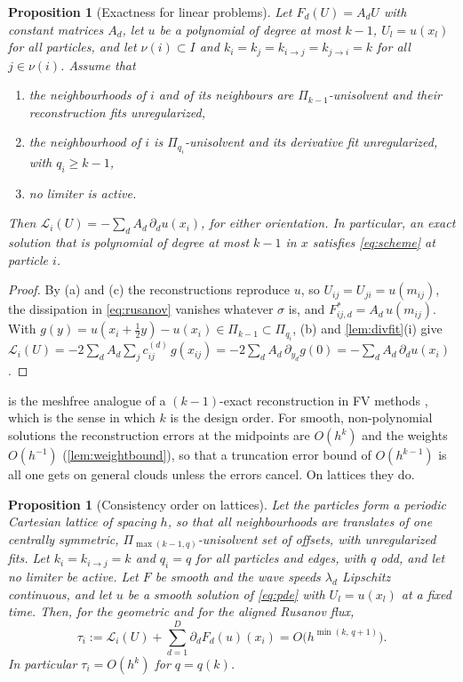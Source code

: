 \documentclass[11pt,a4paper]{article}
\theoremstyle{plain}
\newtheorem{proposition}[theorem]{Proposition}
\theoremstyle{definition}
\theoremstyle{remark}
\numberwithin{equation}{section}
\newcommand{\nb}{\nu}
\newcommand{\Lop}{\mathcal{L}}
\newcommand{\Fs}{F^{*}}
\newcommand{\ord}[2]{k_{#1\to #2}}
\newcommand{\qdiv}{q}
\begin{document}
\begin{proposition}[Exactness for linear problems]\label{prop:exact}
Let $F_d(U)=A_dU$ with constant matrices $A_d$, let $u$ be a polynomial of degree at most $k-1$, $U_l=u(x_l)$ for all particles, and let $\nb(i)\subset I$ and $k_i=k_j=\ord ij=\ord ji=k$ for all $j\in\nb(i)$. Assume that
\begin{enumerate}[label=(\alph*)]
\item the neighbourhoods of $i$ and of its neighbours are $\Pi_{k-1}$-unisolvent and their reconstruction fits unregularized,
\item the neighbourhood of $i$ is $\Pi_{q_i}$-unisolvent and its derivative fit unregularized, with $q_i\ge k-1$,
\item no limiter is active.
\end{enumerate}
Then $\Lop_i(U)=-\sum_d A_d\,\partial_du(x_i)$, for either orientation. In particular, an exact solution that is polynomial of degree at most $k-1$ in $x$ satisfies \eqref{eq:scheme} at particle $i$.
\end{proposition}

\begin{proof}
By (a) and (c) the reconstructions reproduce $u$, so $U_{ij}=U_{ji}=u(m_{ij})$, the dissipation in \eqref{eq:rusanov} vanishes whatever $\sigma$ is, and $\Fs_{ij,d}=A_d\,u(m_{ij})$. With $g(y)=u(x_i+\tfrac12y)-u(x_i)\in\Pi_{k-1}\subset\Pi_{q_i}$, (b) and \cref{lem:divfit}(i) give $\Lop_i(U)=-2\sum_dA_d\sum_jc^{(d)}_{ij}\,g(x_{ij})=-2\sum_dA_d\,\partial_{y_d}g(0)=-\sum_dA_d\,\partial_du(x_i)$.
\end{proof}

 is the meshfree analogue of a $(k-1)$-exact reconstruction in FV methods \cite{BarthFrederickson1990}, which is the sense in which $k$ is the design order. For smooth, non-polynomial solutions the reconstruction errors at the midpoints are $O(h^k)$ and the weights $O(h^{-1})$ (\cref{lem:weightbound}), so that a truncation error bound of $O(h^{k-1})$ is all one gets on general clouds unless the errors cancel. On lattices they do.

\begin{proposition}[Consistency order on lattices]\label{prop:lattice}
Let the particles form a periodic Cartesian lattice of spacing $h$, so that all neighbourhoods are translates of one centrally symmetric, $\Pi_{\max(k-1,q)}$-unisolvent set of offsets, with unregularized fits. Let $k_i=\ord ij=k$ and $q_i=q$ for all particles and edges, with $q$ odd, and let no limiter be active. Let $F$ be smooth and the wave speeds $\lambda_d$ Lipschitz continuous, and let $u$ be a smooth solution of \eqref{eq:pde} with $U_l=u(x_l)$ at a fixed time. Then, for the geometric and for the aligned Rusanov flux,
\begin{equation}\label{eq:lattice}
\tau_i := \Lop_i(U) + \sum_{d=1}^D\partial_dF_d(u)(x_i) = O\big(h^{\min(k,\,q+1)}\big).
\end{equation}
In particular $\tau_i=O(h^k)$ for $q=\qdiv(k)$.
\end{proposition}
\end{document}
